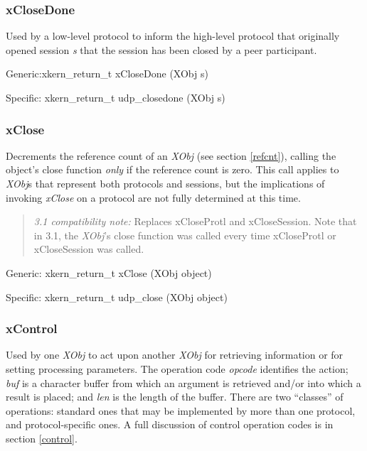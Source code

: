 \subsubsection{xCloseDone}

\noindent Used by a low-level protocol to inform the high-level protocol 
that originally opened session {\em s} that the session has been closed by
a peer participant.
\medskip

{\sanss Generic:}{\sem xkern\_return\_t} {\bold xCloseDone} ({\sem XObj} {\caps s})
\medskip				

{\sanss Specific:} {\sem xkern\_return\_t} {\bold udp\_closedone} ({\sem XObj} {\caps s})

\subsubsection{xClose}

\noindent Decrements the reference count of an {\em XObj} (see section
\ref{refcnt}), calling the object's close function {\em only} if the
reference count is zero. This call applies to {\em XObj}s that represent
both protocols and sessions, but the implications of invoking {\em xClose}
on a protocol are not fully determined at this time.

\begin{quote}
{\em 3.1 compatibility note:} Replaces xCloseProtl and xCloseSession.
Note that in 3.1, the {\em XObj}'s close function was called every
time xCloseProtl or xCloseSession was called.
\end{quote}
\medskip

{\sanss Generic:} {\sem xkern\_return\_t} {\bold xClose} ({\sem XObj} {\caps object})
\medskip

{\sanss Specific:} {\sem xkern\_return\_t} {\bold udp\_close} ({\sem XObj} {\caps object})

\subsubsection{xControl}
\label{xControl}

Used by one {\em XObj} to act upon another {\em XObj} for retrieving
information or for setting processing parameters.  The operation code
{\em opcode} identifies the action; {\em buf} is a character buffer
from which an argument is retrieved and/or into which a result is
placed; and {\em len} is the length of the buffer.  There are two
``classes'' of operations: standard ones that may be implemented by
more than one protocol, and protocol-specific ones.  A full discussion
of control operation codes is in section \ref{control}.

